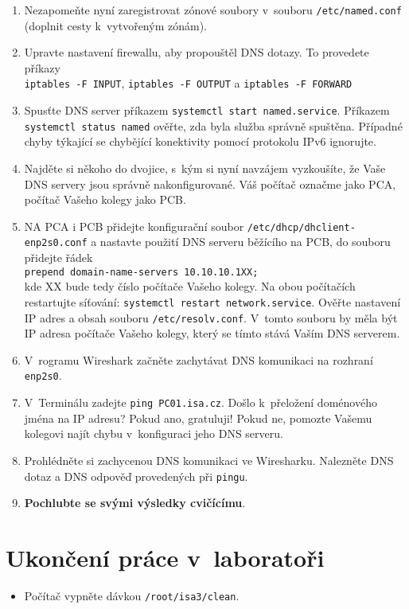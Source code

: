\begin{enumerate}
  \item Nezapomeňte nyní zaregistrovat zónové soubory v~souboru {\tt /etc/named.conf} (doplnit cesty k~vytvořeným zónám).
  \item Upravte nastavení firewallu, aby propouštěl DNS dotazy. To provedete příkazy \\{\tt iptables -F INPUT}, {\tt iptables -F OUTPUT} a {\tt iptables -F FORWARD}

  \item Spusťte DNS server příkazem {\tt systemctl start named.service}.
    Příkazem {\tt systemctl status named} ověřte, zda byla služba správně spuštěna.
    Případné chyby týkající se chybějící konektivity pomocí protokolu IPv6 ignorujte.

  \item Najděte si někoho do dvojice, s~kým si nyní navzájem vyzkoušíte, že Vaše DNS servery jsou správně nakonfigurované.
        Váš počítač označme jako PCA, počítač Vašeho kolegy jako PCB.
  \item NA PCA i PCB přidejte konfigurační soubor {\tt /etc/dhcp/dhclient-enp2s0.conf} a nastavte
    použití DNS serveru běžícího na PCB, do souboru přidejte řádek \\
    {\tt prepend domain-name-servers 10.10.10.1XX;} \\
    kde XX bude tedy číslo počítače Vašeho kolegy. 
    Na obou počítačích restartujte síťování: {\tt systemctl restart network.service}.
    Ověřte nastavení IP adres a obsah souboru {\tt /etc/resolv.conf}. V~tomto souboru by měla být IP adresa počítače Vašeho kolegy, který se tímto stává Vaším DNS serverem.
  \item V~rogramu Wireshark začněte zachytávat DNS komunikaci na rozhraní {\tt enp2s0}.
  \item V~Terminálu zadejte {\tt ping PC01.isa.cz}. Došlo k~přeložení doménového jména na IP adresu? Pokud ano, gratuluji! Pokud ne, pomozte Vašemu kolegovi najít chybu
    v~konfiguraci jeho DNS serveru.
  \item Prohlédněte si zachycenou DNS komunikaci ve Wiresharku. Nalezněte DNS dotaz a DNS odpověď provedených při {\tt pingu}.
  
  \item {\bf Pochlubte se svými výsledky cvičícímu}.
\end{enumerate}




\section{Ukončení práce v~laboratoři}
\begin{itemize}
  \item Počítač vypněte dávkou {\tt /root/isa3/clean}.
\end{itemize}
